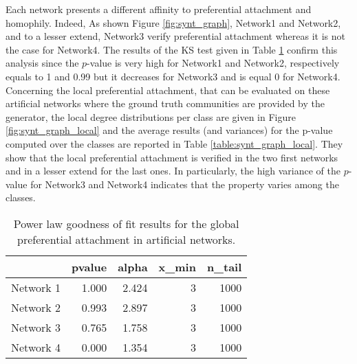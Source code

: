 \documentclass[a4paper, 12pt]{article}
\begin{document}
Each network presents a different affinity to preferential attachment and homophily.
Indeed, As shown Figure \ref{fig:synt_graph}, Network1 and Network2, and to a lesser extend, Network3 verify preferential attachment whereas it is not the case for Network4. The results of the KS test given in Table \ref{table:synt_graph} confirm this analysis since the $p$-value is very high for Network1 and Network2, respectively equals to 1 and 0.99 but it decreases for Network3 and is equal 0 for Network4.
Concerning the local preferential attachment, that can be evaluated on these artificial networks where the ground truth communities are provided by the generator, the local degree distributions per class are given in Figure \ref{fig:synt_graph_local} and the average results (and variances) for the p-value computed over the classes are reported in Table \ref{table:synt_graph_local}. They show that the local preferential attachment is verified in the two first networks and in a lesser extend for the  last ones. In particularly, the high variance of the $p$-value for Network3 and Network4 indicates that the property varies among the classes.




\begin{table}[h]
\caption{Power law goodness of fit results for the global preferential attachment in artificial networks.}
\centering
  \begin{tabular}{lrrrr}
  	\hline
  	&   pvalue &   alpha &   x\_min &   n\_tail \\
  	\hline
  	Network 1 &    1.000 &   2.424 &       3 &     1000 \\
  	Network 2 &    0.993 &   2.897 &       3 &     1000 \\
  	Network 3 &    0.765 &   1.758 &       3 &     1000 \\
  	Network 4 &    0.000 &   1.354 &       3 &     1000 \\
  	\hline
  \end{tabular}
\label{table:synt_graph}
\end{table}
\end{document}
